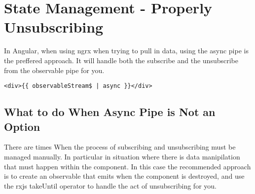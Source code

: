 \maketitle{}
\section{ State Management - Properly Unsubscribing }

In Angular, when using ngrx when trying to pull in data, using the async pipe is
the preffered approach. It will handle both the subscribe and the unsubscribe
from the observable pipe for you.

\begin{lstlisting}
<div>{{ observableStream$ | async }}</div>
\end{lstlisting}

\subsection{ What to do When Async Pipe is Not an Option }
There are times When the process of subscribing and unsubscribing must be
managed manually. In particular in situation where there is data manipilation
that must happen within the component. In this case the recommended approach
is to create an observable that emits when the component is destroyed, and use
the rxjs takeUntil operator to handle the act of unsubscribing for you. 
